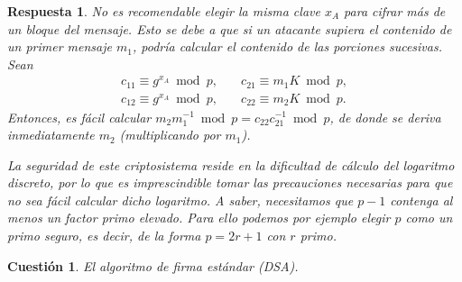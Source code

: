 \documentclass[
  a4paper,
  spanish,
  12pt,
]{scrartcl}
\theoremstyle{ejercicio-style}
\newtheorem{ejer}{Cuestión}
\theoremstyle{remark-style}
\newtheorem*{sol}{Respuesta}
\theoremstyle{teorema-style}
\begin{document}
\begin{sol}
No es recomendable elegir la misma clave $x_A$ para cifrar más de un bloque del mensaje. Esto se debe a que si un atacante supiera el contenido de un primer mensaje \(m_{1}\), podría calcular el contenido de las porciones sucesivas. Sean
\begin{align*}
c_{11}\equiv g^{x_{A}} \bmod{p}, \quad& c_{21}\equiv m_{1}K\bmod{p}, \\
c_{12}\equiv g^{x_{A}} \bmod{p}, \quad& c_{22}\equiv m_{2}K\bmod{p}.
\end{align*}
Entonces, es fácil calcular \(m_2m_1^{-1} \bmod p = c_{22}c_{21}^{-1} \bmod{p}\), de donde se deriva inmediatamente \(m_{2}\) (multiplicando por \(m_{1}\)).

La seguridad de este criptosistema reside en la dificultad de cálculo del logaritmo discreto, por lo que es imprescindible tomar las precauciones necesarias para que no sea fácil calcular dicho logaritmo. A saber, necesitamos que $p-1$ contenga al menos un factor primo elevado. Para ello podemos por ejemplo elegir $p$ como un \textit{primo seguro}, es decir, de la forma $p = 2r + 1$ con $r$ primo.
\end{sol}

\begin{ejer}
  El algoritmo de firma estándar (DSA).
\end{ejer}
\end{document}
